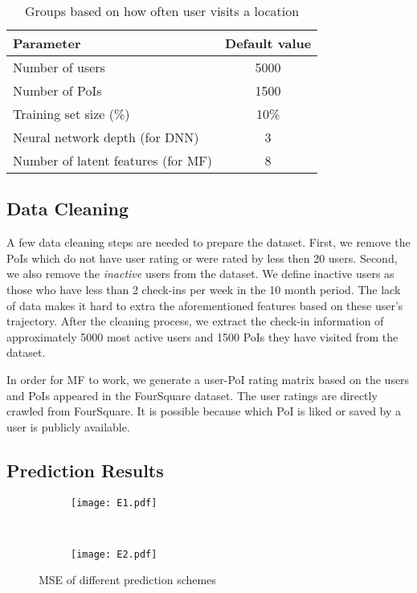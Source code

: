 \begin{table}[htbp]
\begin{center}
\caption{Groups based on how often user visits a location \label{settings}}
\begin{tabular}{|l|c|} \hline
\textbf{Parameter} & \textbf{Default value} \\ \hline
Number of users & 5000  \\ \hline
Number of PoIs & 1500 \\ \hline
Training set size (\%) & 10\% \\ \hline
Neural network depth (for DNN)& 3 \\ \hline
Number of latent features (for MF) & 8 \\ \hline
\end{tabular}
\end{center}
\end{table}

\subsection{Data Cleaning}

A few data cleaning steps are needed to prepare the dataset. First, we remove the PoIs which do not have user rating or were rated by less then 20 users. Second, we also remove the \textit{inactive} users from the dataset. We define inactive users as those who have less than 2 check-ins per week in the 10 month period. The lack of data makes it hard to extra the aforementioned features based on these user's trajectory. After the cleaning process, we extract the check-in information of approximately 5000 most active users and 1500 PoIs they have visited from the dataset.

In order for MF to work, we generate a user-PoI rating matrix based on the users and PoIs appeared in the FourSquare dataset. The user ratings are directly crawled from FourSquare. It is possible because which PoI is liked or saved by a user is publicly available.

\subsection{Prediction Results}

\begin{figure}[htbp]%
        \centering
        \begin{subfigure}{0.25\textwidth}
               \texttt{[image: E1.pdf]}
        \end{subfigure}%
        ~ %
        \begin{subfigure}{0.25\textwidth}
                \texttt{[image: E2.pdf]}
        \end{subfigure}
         \caption{MSE of different prediction schemes}\label{E12}
         \vspace{-2mm}
\end{figure}

